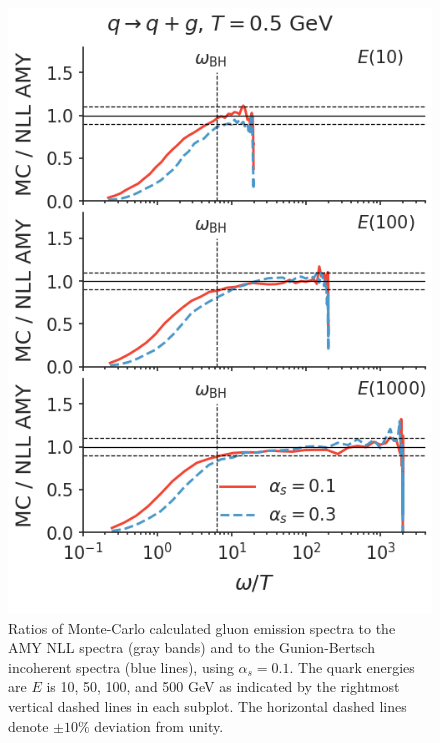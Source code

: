 \documentclass[aps, prc, reprint, amsmath, groupedaddress, nofootinbib]{revtex4-1}
\begin{document}
\begin{appendices}
\begin{figure}
\includegraphics[width=\columnwidth]{spectrum_E_q2qg.png}
\caption{Ratios of Monte-Carlo calculated gluon emission spectra to the AMY NLL spectra (gray bands) and to the Gunion-Bertsch incoherent spectra (blue lines), using $\alpha_s = 0.1$. The quark energies are $E$ is 10, 50, 100, and 500 GeV as indicated by the rightmost vertical dashed lines in each subplot. The horizontal dashed lines denote $\pm 10\%$ deviation from unity.}
\label{fig:spectra-alphas=0.1}
\end{figure}


\end{appendices}
\end{document}
